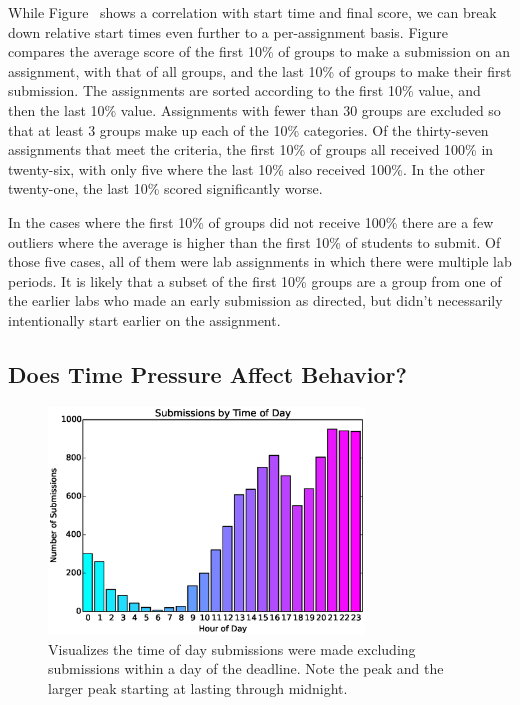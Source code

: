 While Figure~ shows a correlation with start
time and final score, we can break down relative start times even further to a
per-assignment basis. Figure~ compares the average
score of the first 10\% of groups to make a submission on an assignment, with
that of all groups, and the last 10\% of groups to make their first
submission. The assignments are sorted according to the first 10\% value, and
then the last 10\% value. Assignments with fewer than 30 groups are excluded so
that at least 3 groups make up each of the 10\% categories. Of the thirty-seven
assignments that meet the criteria, the first 10\% of groups all received 100\%
in twenty-six, with only five where the last 10\% also received 100\%. In the
other twenty-one, the last 10\% scored significantly worse.

In the cases where the first 10\% of groups did not receive 100\% there are a
few outliers where the average is higher than the first 10\% of students to
submit. Of those five cases, all of them were lab assignments in which there
were multiple lab periods. It is likely that a subset of the first 10\% groups
are a group from one of the earlier labs who made an early submission as
directed, but didn't necessarily intentionally start earlier on the assignment.

\subsection{Does Time Pressure Affect Behavior?}

\begin{figure}[!t]
\centering
\includegraphics[width=3.3in]{graphs/Submissions_by_Time_of_Day.eps}
\caption{Visualizes the time of day submissions were made excluding submissions
  within a day of the deadline. Note the  peak and the larger peak
  starting at  lasting through midnight.}
\end{figure}

